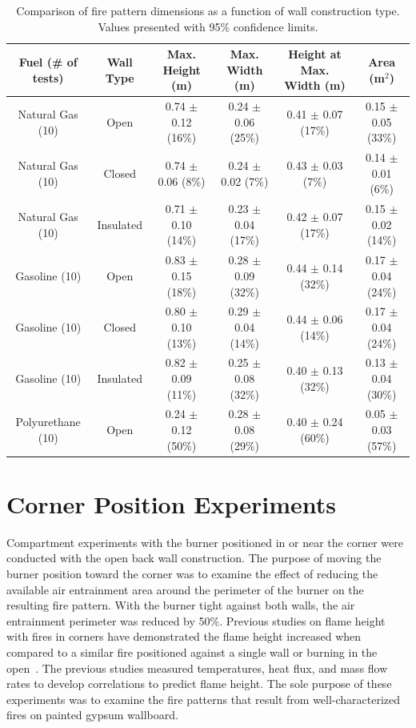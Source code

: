 \documentclass[twoside]{uocthesis}
\begin{document}
{\begin{table}
	\centering
	\footnotesize
	\begin{tabular}{|c|c|c|c|c|c|}
	\hline
	Fuel (\# of tests)      &   Wall Type   &   Max. Height (m)	         & Max. Width (m)               &  Height at Max. Width (m) &  Area (m$^2$)  \\ \hline 
		Natural Gas (10)    &   Open 		& 0.74 	$\pm$ 0.12 (16\%)   &	0.24 $\pm$ 0.06 (25\%) 	& 0.41 $\pm$ 0.07 (17\%)	& 0.15 $\pm$ 0.05 (33\%) 	\\
		Natural Gas (10)    &   Closed 		& 0.74	$\pm$ 0.06 (8\%)    &	0.24 $\pm$ 0.02 (7\%) 		& 0.43 $\pm$ 0.03 (7\%)  	& 0.14 $\pm$ 0.01 (6\%) 	\\
		Natural Gas (10)    &   Insulated 	& 0.71	$\pm$ 0.10 (14\%)   &	0.23 $\pm$ 0.04 (17\%) 	& 0.42 $\pm$ 0.07 (17\%) 	& 0.15 $\pm$ 0.02 (14\%)  	\\
		Gasoline (10)       &   Open    	& 0.83	$\pm$ 0.15 (18\%)   &	0.28 $\pm$ 0.09 (32\%) 	& 0.44 $\pm$ 0.14 (32\%) 	& 0.17 $\pm$ 0.04 (24\%)  	\\
		Gasoline (10)       &   Closed  	& 0.80	$\pm$ 0.10 (13\%)   &	0.29 $\pm$ 0.04 (14\%) 	& 0.44 $\pm$ 0.06 (14\%) 	& 0.17 $\pm$ 0.04 (24\%)  	\\
		Gasoline (10)       &   Insulated	& 0.82 	$\pm$ 0.09 (11\%)   &	0.25 $\pm$ 0.08 (32\%) 	& 0.40 $\pm$ 0.13 (32\%) 	& 0.13 $\pm$ 0.04 (30\%)  	\\
		Polyurethane (10)	&   Open 		& 0.24  $\pm$ 0.12 (50\%) 	 &  0.28 $\pm$ 0.08 (29\%) 	& 0.40 $\pm$ 0.24 (60\%)   & 0.05 $\pm$ 0.03 (57\%)   \\
		\hline
	\end{tabular}
	\caption[Comparison of fire pattern dimensions as a function of wall construction type]{Comparison of fire pattern dimensions as a function of wall construction type. Values presented with 95\% confidence limits.}
	\label{tab:Fire_Pattern_Dimensions_Wall_Construction}
\end{table}

\section{Corner Position Experiments}

Compartment experiments with the burner positioned in or near the corner were conducted with the open back wall construction.  The purpose of moving the burner position toward the corner was to examine the effect of reducing the available air entrainment area around the perimeter of the burner on the resulting fire pattern.  With the burner tight against both walls, the air entrainment perimeter was reduced by 50\%. Previous studies on flame height with fires in corners have demonstrated the flame height increased when compared to a similar fire positioned against a single wall or burning in the open~\cite{Poreh:1999,Saito:1993,Takahashi:1997,Kokkala:1993}.  The previous studies measured temperatures, heat flux, and mass flow rates to develop correlations to predict flame height. The sole purpose of these experiments was to examine the fire patterns that result from well-characterized fires on painted gypsum wallboard.       

}
\end{document}
